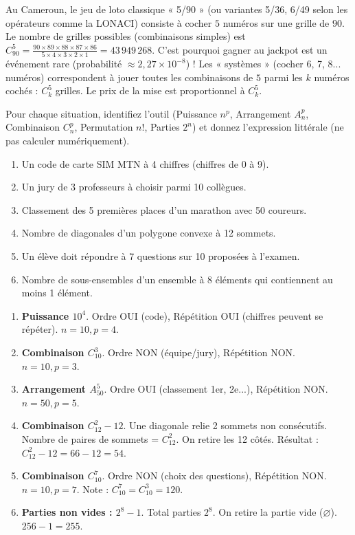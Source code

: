 \documentclass[11pt]{article}
\begin{document}
\begin{savaistu}
Au Cameroun, le jeu de loto classique « 5/90 » (ou variantes 5/36, 6/49 selon les opérateurs comme la LONACI) consiste à cocher $5$ numéros sur une grille de $90$.
Le nombre de grilles possibles (combinaisons simples) est $C_{90}^5 = \frac{90 \times 89 \times 88 \times 87 \times 86}{5 \times 4 \times 3 \times 2 \times 1} = 43\,949\,268$.
C'est pourquoi gagner au jackpot est un événement rare (probabilité $\approx 2,27 \times 10^{-8}$) !
Les « systèmes » (cocher 6, 7, 8... numéros) correspondent à jouer toutes les combinaisons de $5$ parmi les $k$ numéros cochés : $C_k^5$ grilles. Le prix de la mise est proportionnel à $C_k^5$.
\end{savaistu}

\begin{exercice}
Pour chaque situation, identifiez l'outil (Puissance $n^p$, Arrangement $A_n^p$, Combinaison $C_n^p$, Permutation $n!$, Parties $2^n$) et donnez l'expression littérale (ne pas calculer numériquement).
\begin{enumerate}
    \item Un code de carte SIM MTN à 4 chiffres (chiffres de 0 à 9).
    \item Un jury de 3 professeurs à choisir parmi 10 collègues.
    \item Classement des 5 premières places d'un marathon avec 50 coureurs.
    \item Nombre de diagonales d'un polygone convexe à 12 sommets.
    \item Un élève doit répondre à 7 questions sur 10 proposées à l'examen.
    \item Nombre de sous-ensembles d'un ensemble à 8 éléments qui contiennent au moins 1 élément.
\end{enumerate}
\end{exercice}

\begin{corrige}
\begin{enumerate}
    \item \textbf{Puissance $10^4$}. Ordre OUI (code), Répétition OUI (chiffres peuvent se répéter). $n=10, p=4$.
    \item \textbf{Combinaison $C_{10}^3$}. Ordre NON (équipe/jury), Répétition NON. $n=10, p=3$.
    \item \textbf{Arrangement $A_{50}^5$}. Ordre OUI (classement 1er, 2e...), Répétition NON. $n=50, p=5$.
    \item \textbf{Combinaison $C_{12}^2 - 12$}. Une diagonale relie 2 sommets non consécutifs. Nombre de paires de sommets = $C_{12}^2$. On retire les 12 côtés. Résultat : $C_{12}^2 - 12 = 66 - 12 = 54$.
    \item \textbf{Combinaison $C_{10}^7$}. Ordre NON (choix des questions), Répétition NON. $n=10, p=7$. Note : $C_{10}^7 = C_{10}^3 = 120$.
    \item \textbf{Parties non vides : $2^8 - 1$}. Total parties $2^8$. On retire la partie vide ($\varnothing$). $256 - 1 = 255$.
\end{enumerate}
\end{corrige}
\end{document}
